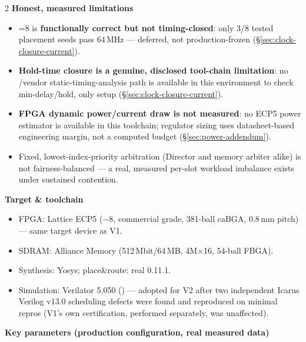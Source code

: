 \begin{multicols}{2}
{\color{fnDark}\large\bfseries Honest, measured limitations}\\[2pt]
{\footnotesize
\begin{itemize}[leftmargin=1.1em]
\item {}=8 is \textbf{functionally correct but not
      timing-closed}: only 3/8 tested placement seeds pass 64\,MHz ---
      deferred, not production-frozen (\S\ref{sec:clock-closure-current}).
\item \textbf{Hold-time closure is a genuine, disclosed tool-chain
      limitation}: no /vendor static-timing-analysis path
      is available in this environment to check min-delay/hold, only
      setup (\S\ref{sec:clock-closure-current}).
\item \textbf{FPGA dynamic power/current draw is not measured}: no ECP5
      power estimator is available in this toolchain; regulator sizing
      uses datasheet-based engineering margin, not a computed budget
      (\S\ref{sec:power-addendum}).
\item Fixed, lowest-index-priority arbitration (Director and memory
      arbiter alike) is not fairness-balanced --- a real, measured
      per-slot workload imbalance exists under sustained contention.
\end{itemize}}

\vspace{4pt}
{\color{fnDark}\large\bfseries Target \& toolchain}\\[2pt]
{\footnotesize
\begin{itemize}[leftmargin=1.1em]
\item FPGA: Lattice ECP5  ($-8$, commercial grade,
      381-ball caBGA, 0.8\,mm pitch) --- same target device as V1.
\item SDRAM: Alliance Memory  (512\,Mbit/64\,MB,
      4M$\times$16, 54-ball FBGA).
\item Synthesis: Yosys; place\&route: real  0.11.1.
\item Simulation: Verilator 5.050 () --- adopted
      for V2 after two independent Icarus Verilog v13.0 scheduling
      defects were found and reproduced on minimal repros (V1's own
      certification, performed separately, was unaffected).
\end{itemize}}
\end{multicols}

\vspace{2pt}
\noindent
{\small\color{fnDark}\bfseries Key parameters (production configuration,
real measured data)}
\vspace{2pt}

